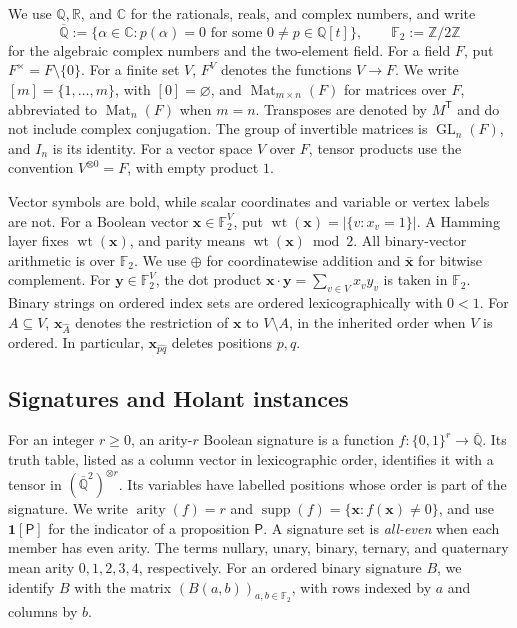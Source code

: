 \documentclass[11pt,letterpaper,onecolumn]{article}
\theoremstyle{plain}
\theoremstyle{definition}
\theoremstyle{remark}
\newcommand{\AlgNums}{\overline{\mathbb Q}}
\newcommand{\Ftwo}{\mathbb F_2}
\newcommand{\GL}{\operatorname{GL}}
\newcommand{\Mat}{\operatorname{Mat}}
\newcommand{\wt}{\operatorname{wt}}
\newcommand{\supp}{\operatorname{supp}}
\newcommand{\arity}{\operatorname{arity}}
\newcommand{\one}{\mathbf 1}
\begin{document}
We use \(\mathbb Q,\mathbb R\),
and \(\mathbb C\) for the rationals, reals, and complex numbers, and write
\[
\AlgNums:=\{\alpha\in\mathbb C:p(\alpha)=0
\text{ for some }0\ne p\in\mathbb Q[t]\},
\qquad
\Ftwo:=\mathbb Z/2\mathbb Z
\]
for the algebraic complex numbers and the two-element field.
For a field \(F\), put \(F^\times=F\setminus\{0\}\). For a finite set
\(V\), \(F^V\) denotes the functions \(V\to F\).
We write \([m]=\{1,\ldots,m\}\), with \([0]=\varnothing\), and
\(\Mat_{m\times n}(F)\) for matrices over \(F\), abbreviated to
\(\Mat_n(F)\) when \(m=n\).  Transposes are denoted by \(M^{\mathsf T}\)
and do not include complex conjugation.  The group of invertible matrices
is \(\GL_n(F)\), and \(I_n\) is its identity.
For a vector space \(V\) over \(F\), tensor products use the convention
\(V^{\otimes0}=F\), with empty product \(1\).

Vector symbols are bold, while scalar coordinates and variable or vertex labels
are not.  For a Boolean vector \({\mathbf x}\in\Ftwo^V\), put
\(\wt({\mathbf x})=|\{v:x_v=1\}|\).  A Hamming layer fixes \(\wt({\mathbf x})\), and parity
means \(\wt({\mathbf x})\bmod2\).  All binary-vector arithmetic is over \(\Ftwo\).
We use \(\oplus\) for coordinatewise addition and \(\bar {\mathbf x}\) for bitwise complement.  For \({\mathbf y}\in\Ftwo^V\), the dot product
\({\mathbf x}\cdot {\mathbf y}=\sum_{v\in V}x_vy_v\) is taken in \(\Ftwo\).
Binary strings on ordered index sets are ordered lexicographically with
\(0<1\).  For \(A\subseteq V\), \({\mathbf x}_{\widehat A}\) denotes the restriction
of \({\mathbf x}\) to \(V\setminus A\), in the inherited order when \(V\) is ordered.
In particular, \({\mathbf x}_{\widehat{pq}}\) deletes positions \(p,q\).

\subsection{Signatures and Holant instances}
\label{subsec:holant-definitions}

For an integer \(r\ge0\), an arity-\(r\)
	Boolean signature is a
function \(f:\{0,1\}^r\to\AlgNums\). Its truth table, listed as a column
vector in lexicographic order, identifies it with a tensor in
\((\AlgNums^2)^{\otimes r}\). Its variables have labelled positions whose
order is part of the signature. We
	write \(\arity(f)=r\) and \(\supp(f)=\{{\mathbf x}:f({\mathbf x})\ne0\}\), and use
	\(\one[\mathsf P]\) for the indicator of a proposition \(\mathsf P\).
	A signature set is \emph{all-even} when each member has even
arity. The terms nullary, unary, binary, ternary, and quaternary mean
arity \(0,1,2,3,4\), respectively.
	For an ordered binary signature \(B\), we identify \(B\) with the matrix
	\((B(a,b))_{a,b\in\Ftwo}\), with rows indexed by \(a\) and columns by \(b\).
\end{document}
